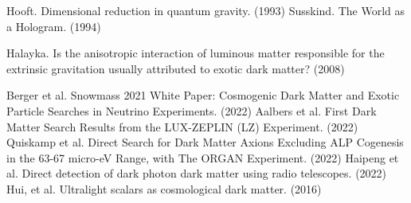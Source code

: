 \documentclass[12pt]{article}
\begin{document}
\begin{thebibliography}{9}
 Hooft. Dimensional reduction in quantum gravity. (1993)
 Susskind. The World as a Hologram. (1994)

 Halayka. Is the anisotropic interaction of luminous matter responsible for the extrinsic gravitation usually attributed to exotic dark matter? (2008)

 Berger et al. Snowmass 2021 White Paper: Cosmogenic Dark Matter and Exotic Particle Searches in Neutrino Experiments. (2022)
 Aalbers et al. First Dark Matter Search Results from the LUX-ZEPLIN (LZ) Experiment. (2022)
 Quiskamp et al. Direct Search for Dark Matter Axions Excluding ALP Cogenesis in the 63-67 micro-eV Range, with The ORGAN Experiment. (2022)
 Haipeng et al. Direct detection of dark photon dark matter using radio telescopes. (2022)
 Hui, et al. Ultralight scalars as cosmological dark matter. (2016)


\end{thebibliography}
\end{document}
